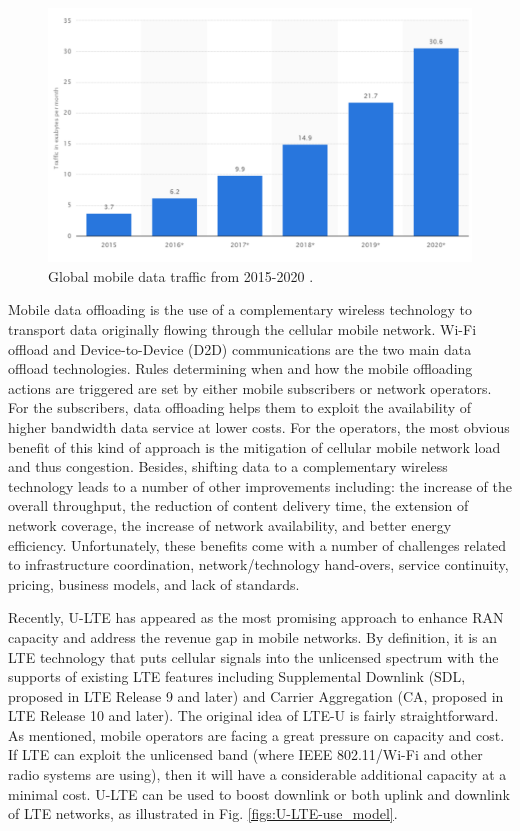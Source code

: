\begin{figure}[!t]
	\centering
	\includegraphics[width=0.8\columnwidth]{figures2/global-mobile-data-traffic-2015-2020.pdf}
	\caption{Global mobile data traffic from 2015-2020 \cite{cisco_mobile_traffic_2015}.}
	\label{figs:global-mobile-data-traffic-2015-2020}
\end{figure}


Mobile data offloading is the use of a complementary wireless technology to transport data originally flowing through the cellular mobile network. Wi-Fi offload and Device-to-Device (D2D) communications are the two main data offload technologies. Rules determining when and how the mobile offloading actions are triggered are set by either mobile subscribers or network operators. For the subscribers, data offloading helps them to exploit the availability of higher bandwidth data service at lower costs. For the operators, the most obvious benefit of this kind of approach is the mitigation of cellular mobile network load and thus congestion. Besides, shifting data to a complementary wireless technology leads to a number of other improvements including: the increase of the overall throughput, the reduction of content delivery time, the extension of network coverage, the increase of network availability, and better energy efficiency. Unfortunately, these benefits come with a number of challenges related to infrastructure coordination, network/technology hand-overs, service continuity, pricing, business models, and lack of standards. 

Recently, U-LTE has appeared as the most promising approach to enhance RAN capacity and address the revenue gap in mobile networks. By definition, it is an LTE technology that puts cellular signals into the unlicensed spectrum with the supports of existing LTE features including Supplemental Downlink (SDL, proposed in LTE Release 9 and later) and Carrier Aggregation (CA, proposed in LTE Release 10 and later). The original idea of LTE-U is fairly straightforward. As mentioned, mobile operators are facing a great pressure on capacity and cost. If LTE can exploit the unlicensed band (where IEEE 802.11/Wi-Fi and other radio systems are using), then it will have a considerable additional capacity at a minimal cost. U-LTE can be used to boost downlink or both uplink and downlink of LTE networks, as illustrated in Fig. \ref{figs:U-LTE-use_model}.

